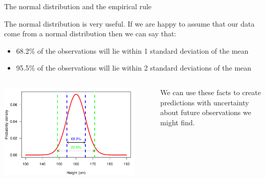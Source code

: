 \documentclass[12pt,xcolor=dvipsnames,handout,mathserif,aspectratio=169]{beamer}
\begin{document}
\begin{frame}{ The normal distribution and the empirical rule}

The normal distribution is very useful. If we are happy to assume that our data come from a normal distribution then we can say that:
\begin{block}{}
\begin{itemize}
\item 68.2\% of the observations will lie within 1 standard deviation of the mean
\item 95.5\% of the observations will lie within 2 standard deviations of the mean
\end{itemize}
\end{block}
\pause
\begin{columns}
\begin{column}{0.5\textwidth}
\begin{center}
\includegraphics[width=0.9\textwidth]{NormalRule.pdf}
\end{center}
\end{column}
\pause
\begin{column}{0.5\textwidth}
We can use these facts to create predictions with uncertainty about future observations we might find.
\end{column}
\end{columns}
\end{frame}
\end{document}
